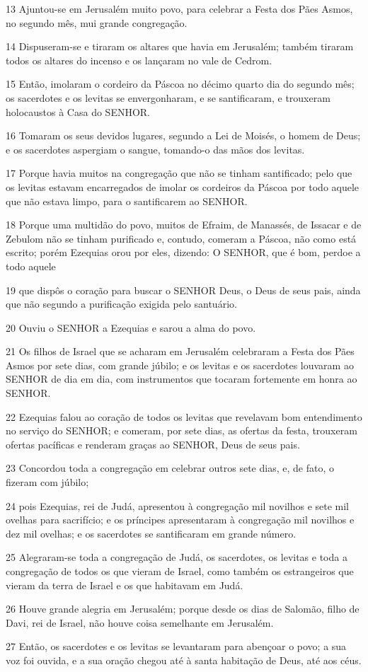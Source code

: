 \par 13 Ajuntou-se em Jerusalém muito povo, para celebrar a Festa dos Pães Asmos, no segundo mês, mui grande congregação.
\par 14 Dispuseram-se e tiraram os altares que havia em Jerusalém; também tiraram todos os altares do incenso e os lançaram no vale de Cedrom.
\par 15 Então, imolaram o cordeiro da Páscoa no décimo quarto dia do segundo mês; os sacerdotes e os levitas se envergonharam, e se santificaram, e trouxeram holocaustos à Casa do SENHOR.
\par 16 Tomaram os seus devidos lugares, segundo a Lei de Moisés, o homem de Deus; e os sacerdotes aspergiam o sangue, tomando-o das mãos dos levitas.
\par 17 Porque havia muitos na congregação que não se tinham santificado; pelo que os levitas estavam encarregados de imolar os cordeiros da Páscoa por todo aquele que não estava limpo, para o santificarem ao SENHOR.
\par 18 Porque uma multidão do povo, muitos de Efraim, de Manassés, de Issacar e de Zebulom não se tinham purificado e, contudo, comeram a Páscoa, não como está escrito; porém Ezequias orou por eles, dizendo: O SENHOR, que é bom, perdoe a todo aquele
\par 19 que dispôs o coração para buscar o SENHOR Deus, o Deus de seus pais, ainda que não segundo a purificação exigida pelo santuário.
\par 20 Ouviu o SENHOR a Ezequias e sarou a alma do povo.
\par 21 Os filhos de Israel que se acharam em Jerusalém celebraram a Festa dos Pães Asmos por sete dias, com grande júbilo; e os levitas e os sacerdotes louvaram ao SENHOR de dia em dia, com instrumentos que tocaram fortemente em honra ao SENHOR.
\par 22 Ezequias falou ao coração de todos os levitas que revelavam bom entendimento no serviço do SENHOR; e comeram, por sete dias, as ofertas da festa, trouxeram ofertas pacíficas e renderam graças ao SENHOR, Deus de seus pais.
\par 23 Concordou toda a congregação em celebrar outros sete dias, e, de fato, o fizeram com júbilo;
\par 24 pois Ezequias, rei de Judá, apresentou à congregação mil novilhos e sete mil ovelhas para sacrifício; e os príncipes apresentaram à congregação mil novilhos e dez mil ovelhas; e os sacerdotes se santificaram em grande número.
\par 25 Alegraram-se toda a congregação de Judá, os sacerdotes, os levitas e toda a congregação de todos os que vieram de Israel, como também os estrangeiros que vieram da terra de Israel e os que habitavam em Judá.
\par 26 Houve grande alegria em Jerusalém; porque desde os dias de Salomão, filho de Davi, rei de Israel, não houve coisa semelhante em Jerusalém.
\par 27 Então, os sacerdotes e os levitas se levantaram para abençoar o povo; a sua voz foi ouvida, e a sua oração chegou até à santa habitação de Deus, até aos céus.

